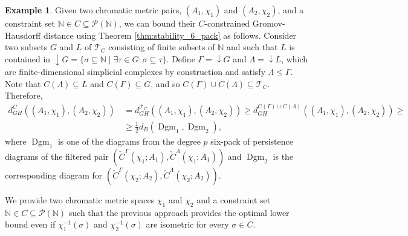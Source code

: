 \documentclass[8pt,a4paper,oneside,english,english]{article}
\theoremstyle{plain}
\theoremstyle
{plain}
\theoremstyle{definition}
\newtheorem{example}[theorem]{Example}%
\newcommand{\N}{\mathbb{N}}
\newcommand{\Tau}{\mathcal T}
\newcommand{\GH}{d_{GH}}
\newcommand{\MP}[1]{(A_{#1},\chi_{#1})}
\DeclareMathOperator{\Dgm}{Dgm}
\begin{document}
\begin{example}        \label{ex:lower_bound_from_stability_6pack}
    Given two chromatic metric pairs, $\MP{1}$ and $\MP{2}$, and a constraint set $\N\in C\subseteq\mathcal P(\N)$, we can bound their $C$-constrained Gromov-Hausdorff distance using Theorem \ref{thm:stability_6_pack} as follows. Consider two subsets $G$ and $L$ of $\Tau_C$ consisting of finite subsets of $\N$ and such that $L$ is contained in $\downarrow G=\{\sigma\subseteq\N\mid\exists\tau\in G:\sigma\subseteq\tau\}$. Define $\Gamma=\downarrow G$ and $\Lambda=\downarrow L$, which are finite-dimensional simplicial complexes by construction and satisfy $\Lambda\leq\Gamma$. Note that $C(\Lambda)\subseteq L$ and $C(\Gamma)\subseteq G$, and so $C(\Gamma)\cup C(\Lambda)\subseteq\Tau_C$. Therefore,
    \[
    \begin{aligned}
    \GH^C(\MP{1},\MP{2})&\,=\GH^{\Tau_C}(\MP{1},\MP{2})\geq \GH^{C(\Gamma)\cup C(\Lambda)}(\MP{1},\MP{2})\geq\\
    &\,\geq\frac{1}{2}d_B(\Dgm_1,\Dgm_2),
    \end{aligned}
    \]
    where $\Dgm_1$ is one of the diagrams from the degree $p$ six-pack of persistence diagrams of the filtered pair $(\check{C}^\Gamma(\chi_1;A_1),\check C^\Lambda(\chi_1;A_1))$ and $\Dgm_2$ is the corresponding diagram for $(\check{C}^\Gamma(\chi_2;A_2),\check C^\Lambda(\chi_2;A_2))$.
    
    We provide two chromatic metric spaces $\chi_1$ and $\chi_2$ and a constraint set $\N\in C\subseteq\mathcal P(\N)$ such that the previous approach provides the optimal lower bound even if $\chi_1^{-1}(\sigma)$ and $\chi_2^{-1}(\sigma)$ are isometric for every $\sigma\in C$.


\end{example}
\end{document}
